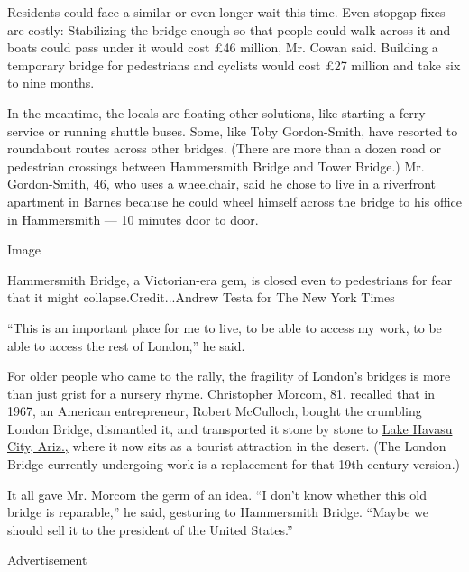Residents could face a similar or even longer wait this time. Even
stopgap fixes are costly: Stabilizing the bridge enough so that people
could walk across it and boats could pass under it would cost £46
million, Mr. Cowan said. Building a temporary bridge for pedestrians and
cyclists would cost £27 million and take six to nine months.

In the meantime, the locals are floating other solutions, like starting
a ferry service or running shuttle buses. Some, like Toby Gordon-Smith,
have resorted to roundabout routes across other bridges. (There are more
than a dozen road or pedestrian crossings between Hammersmith Bridge and
Tower Bridge.) Mr. Gordon-Smith, 46, who uses a wheelchair, said he
chose to live in a riverfront apartment in Barnes because he could wheel
himself across the bridge to his office in Hammersmith --- 10 minutes
door to door.

Image

Hammersmith Bridge, a Victorian-era gem, is closed even to pedestrians
for fear that it might collapse.Credit...Andrew Testa for The New York
Times

``This is an important place for me to live, to be able to access my
work, to be able to access the rest of London,'' he said.

For older people who came to the rally, the fragility of London's
bridges is more than just grist for a nursery rhyme. Christopher Morcom,
81, recalled that in 1967, an American entrepreneur, Robert McCulloch,
bought the crumbling London Bridge, dismantled it, and transported it
stone by stone to
\href{https://www.google.co.uk/travel/things-to-do/see-all?g2lb=2502548\%2C4258168\%2C4270442\%2C4306835\%2C4308226\%2C4317915\%2C4322823\%2C4328159\%2C4371335\%2C4401769\%2C4403882\%2C4419364\%2C4424916\%2C4425793\%2C4427776\%2C4432284\%2C4270859\%2C4284970\%2C4291517\%2C4412693\&hl=en\&gl=uk\&un=1\&dest_mid=\%2Fm\%2F0qpxs\&dest_state_type=sattd\&dest_src=ts\&sa=X\&ved=2ahUKEwiCir6h5NbrAhWS2aQKHSXaA_4Q69EBKAAwCnoECAQQCw\#ttdm=34.459092_-114.343583_12\&ttdmf=\%252Fm\%252F0dlk69g}{Lake
Havasu City, Ariz.,} where it now sits as a tourist attraction in the
desert. (The London Bridge currently undergoing work is a replacement
for that 19th-century version.)

It all gave Mr. Morcom the germ of an idea. ``I don't know whether this
old bridge is reparable,'' he said, gesturing to Hammersmith Bridge.
``Maybe we should sell it to the president of the United States.''

Advertisement

